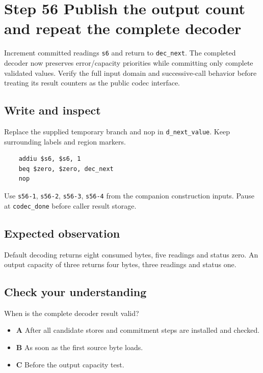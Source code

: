 \section{Step 56 Publish the output count and repeat the complete decoder}\label{delta-s56}

Increment committed readings \texttt{s6} and return to \texttt{dec\_next}. The completed decoder now preserves error/capacity priorities while committing only complete validated values. Verify the full input domain and successive-call behavior before treating its result counters as the public codec interface.

\subsection{Write and inspect}
Replace the supplied temporary branch and nop in \texttt{d\_next\_value}. Keep surrounding labels and region markers.

\begin{verbatim}
    addiu $s6, $s6, 1
    beq $zero, $zero, dec_next
    nop
\end{verbatim}
Use \texttt{s56-1}, \texttt{s56-2}, \texttt{s56-3}, \texttt{s56-4} from the companion construction inputs. Pause at \texttt{codec\_done} before caller result storage.

\subsection{Expected observation}
Default decoding returns eight consumed bytes, five readings and status zero. An output capacity of three returns four bytes, three readings and status one.

\subsection{Check your understanding}
When is the complete decoder result valid?

\begin{itemize}
  \item \textbf{A} After all candidate stores and commitment steps are installed and checked.
  \item \textbf{B} As soon as the first source byte loads.
  \item \textbf{C} Before the output capacity test.
\end{itemize}
